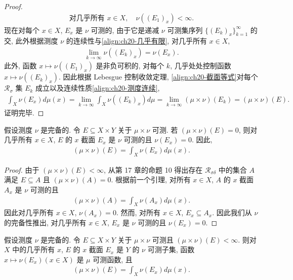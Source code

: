 \documentclass[../../main.tex]{subfiles}
\begin{document}
\begin{proof}
\begin{align}\label{align:ch20-几乎有限}
\text{对几乎所有 }x\in X,\quad\nu((E_{1})_{x})<\infty.
\end{align}
现在对每个 $x\in X$, $E_{x}$ 是 $\nu$ 可测的, 由于它是递减 $\nu$ 可测集序列 $\{(E_{k})_{x}\}_{k=1}^{\infty}$ 的交, 此外根据测度 $\nu$ 的连续性与\eqref{align:ch20-几乎有限}, 对几乎所有 $x\in X$,
\begin{align*}
\lim_{k\to\infty}\nu((E_{k})_{x})=\nu(E_{x}).
\end{align*}
此外, 函数 $x\mapsto\nu((E_{1})_{x})$ 是非负可积的, 对每个 $k$, 几乎处处控制函数 $x\mapsto\nu((E_{k})_{x})$. 因此根据 Lebesgue 控制收敛定理, \eqref{align:ch20-截面等式}对每个 $\mathcal{R}_{\sigma}$ 集 $E_{k}$ 成立以及连续性质\eqref{align:ch20-测度连续},
\begin{align*}
\int_{X}\nu(E_{x})d\mu(x)=\lim_{k\to\infty}\int_{X}\nu((E_{k})_{x})d\mu=\lim_{k\to\infty}(\mu\times\nu)(E_{k})=(\mu\times\nu)(E).
\end{align*}
证明完毕.
\end{proof}

\begin{lemma}\label{lemma:ch20-零测集截面}
假设测度 $\nu$ 是完备的. 令 $E\subseteq X\times Y$ 关于 $\mu\times\nu$ 可测. 若 $(\mu\times\nu)(E)=0$, 则对几乎所有 $x\in X$, $E$ 的 $x$ 截面 $E_{x}$ 是 $\nu$ 可测的且 $\nu(E_{x})=0$. 因此,
\begin{align*}
(\mu\times\nu)(E)=\int_{X}\nu(E_{x})d\mu(x).
\end{align*}
\end{lemma}

\begin{proof}
由于 $(\mu\times\nu)(E)<\infty$, 从第 17 章的命题 10 得出存在 $\mathcal{R}_{\sigma\delta}$ 中的集合 $A$ 满足 $E\subseteq A$ 且 $(\mu\times\nu)(A)=0$. 根据前一个引理, 对所有 $x\in X$, $A$ 的 $x$ 截面 $A_{x}$ 是 $\nu$ 可测的且
\begin{align*}
(\mu\times\nu)(A)=\int_{X}\nu(A_{x})d\mu(x).
\end{align*}
因此对几乎所有 $x\in X$, $\nu(A_{x})=0$. 然而, 对所有 $x\in X$, $E_{x}\subseteq A_{x}$. 因此我们从 $\nu$ 的完备性推出, 对几乎所有 $x\in X$, $E_{x}$ 是 $\nu$ 可测的且 $\nu(E_{x})=0$.
\end{proof}

\begin{proposition}\label{proposition:ch20-有限测度截面}
假设测度 $\nu$ 是完备的. 令 $E\subseteq X\times Y$ 关于 $\mu\times\nu$ 可测且 $(\mu\times\nu)(E)<\infty$. 则对 $X$ 中的几乎所有 $x$, $E$ 的 $x$ 截面 $E_{x}$ 是 $Y$ 的 $\nu$ 可测子集, 函数 $x\mapsto\nu(E_{x})(x\in X)$ 是 $\mu$ 可测函数, 且
\begin{align}\label{align:ch20-可测集截面}
(\mu\times\nu)(E)=\int_{X}\nu(E_{x})d\mu(x).
\end{align}
\end{proposition}
\end{document}
